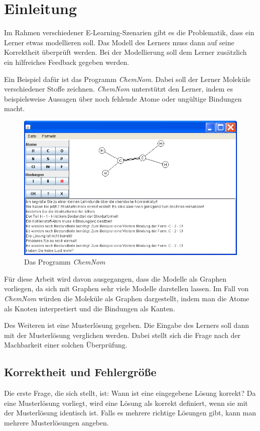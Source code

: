 \chapter{Einleitung}

Im Rahmen verschiedener E-Learning-Szenarien gibt es die 
Problematik, dass ein Lerner etwas modellieren soll. Das 
Modell des Lerners muss dann auf seine Korrektheit 
überprüft werden. Bei der Modellierung soll dem Lerner 
zusätzlich ein hilfreiches Feedback gegeben werden.

Ein Beispiel dafür ist das Programm \emph{ChemNom}. Dabei 
soll der Lerner Moleküle verschiedener Stoffe zeichnen.
\emph{ChemNom} unterstützt den Lerner, indem es beispielsweise 
Aussagen über noch fehlende Atome oder ungültige Bindungen 
macht.

\begin{figure}[htb]
	\centering
		\includegraphics[width=0.7\linewidth,keepaspectratio]{bilder/chemnom.png}
	\caption{Das Programm \emph{ChemNom}}
	\label{fig:chemnom}
\end{figure}

Für diese Arbeit wird davon ausgegangen, dass die 
Modelle als Graphen vorliegen, da sich mit Graphen sehr 
viele Modelle darstellen lassen. 
Im Fall von \emph{ChemNom} würden die Moleküle als Graphen dargestellt, 
indem man die Atome als Knoten interpretiert und die Bindungen 
als Kanten.

Des Weiteren ist eine Musterlösung gegeben. Die Eingabe des 
Lerners soll dann mit der Musterlösung verglichen werden. 
Dabei stellt sich die Frage nach der Machbarkeit einer 
solchen Überprüfung.

\section{Korrektheit und Fehlergröße}
Die erste Frage, die sich stellt, ist: Wann ist eine 
eingegebene Lösung korrekt? Da eine Musterlösung vorliegt, 
wird eine Lösung als korrekt definiert, wenn sie mit der 
Musterlösung identisch ist. Falls es mehrere richtige Lösungen 
gibt, kann man mehrere Musterlösungen angeben.


